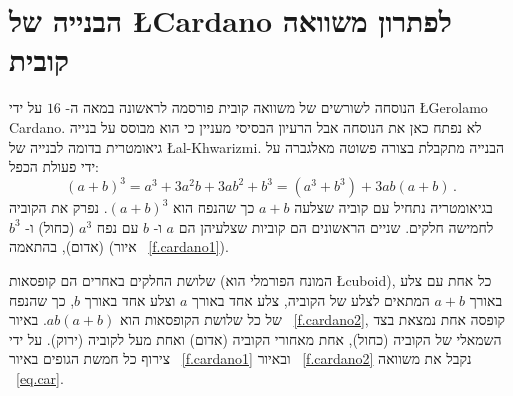 
\section{הבנייה של
\L{Cardano}
לפתרון משוואה קובית}
\label{s.cardano}

הנוסחה לשורשים של משוואה קובית פורסמה לראשונה במאה ה-%
$16$
על ידי 
\L{Gerolamo Cardano}.
לא נפתח כאן את הנוסחה אבל הרעיון הבסיסי מעניין כי הוא מבוסס על בנייה גיאומטרית בדומה לבנייה של 
\L{al-Khwarizmi}.
הבנייה מתקבלת בצורה פשוטה מאלגברה על ידי פעולת הכפל:
\begin{equation}\label{eq.car}
(a+b)^3=a^3+3a^2b+3ab^2+b^3=(a^3+b^3)+3ab(a+b)\,.
\end{equation}
בגיאומטריה נתחיל עם קוביה שצלעה 
$a+b$
כך שהנפח הוא
$(a+b)^3$.
נפרק את הקוביה לחמישה חלקים. שניים הראשונים הם קוביות שצלעיהן הם
$a$
ו-%
$b$
עם נפח
$a^3$ (כחול)
ו-%
$b^3$ (אדום),
בהתאמה (איור%
~\ref{f.cardano1}).

שלושת החלקים באחרים הם קופסאות (המונח הפורמלי הוא
\L{cuboid}),
כל אחת עם צלע באורך
$a+b$
המתאים לצלע של הקוביה, צלע אחד באורך
$a$
וצלע אחד באורך
$b$,
כך שהנפח של כל שלושת הקופסאות הוא
$ab(a+b)$.
באיור%
~\ref{f.cardano2},
קופסה אחת נמצאת בצד השמאלי של הקוביה (כחול), אחת מאחורי הקוביה (אדום) ואחת מעל לקוביה (ירוק). על ידי צירוף כל חמשת הגופים באיור%
~\ref{f.cardano1}
ובאיור%
~\ref{f.cardano2}
נקבל את משוואה
~\ref{eq.car}.

